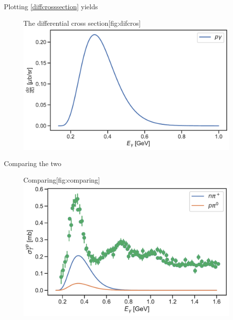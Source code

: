 Plotting \eqref{diffcrosssection} yields
\begin{figure}[H]
    \begin{sidecaption}{The differential cross section}[fig:difcros]
    \includegraphics[width=\linewidth]{Figures/theorypgamma.pdf}
    \end{sidecaption}
\end{figure}
Comparing the two
\begin{figure}[H]
    \begin{sidecaption}{Comparing}[fig:comparing]
    \includegraphics[width=\linewidth]{Figures/comparingtheoryexperiment.pdf}
    \end{sidecaption}
\end{figure}
